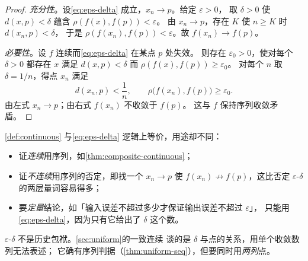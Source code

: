 \begin{proof}
  \emph{充分性}。设\cref{eq:eps-delta} 成立，\(x_{n} \to p\)。给定 \(\varepsilon>0\)，
  取 \(\delta>0\) 使 \(d(x,p)<\delta\) 蕴含 \(\rho(f(x),f(p))<\varepsilon\)。
  由 \(x_{n} \to p\)，存在 \(K\) 使 \(n \ge K\) 时 \(d(x_{n},p)<\delta\)，
  于是 \(\rho(f(x_{n}),f(p))<\varepsilon\)。故 \(f(x_{n}) \to f(p)\)。

  \emph{必要性}。设 \(f\) 连续而\cref{eq:eps-delta} 在某点 \(p\) 处失效。
  则存在 \(\varepsilon_{0}>0\)，使对每个 \(\delta>0\) 都存在 \(x\) 满足
  \(d(x,p)<\delta\) 而 \(\rho(f(x),f(p)) \ge \varepsilon_{0}\)。
  对每个 \(n\) 取 \(\delta = 1/n\)，得点 \(x_{n}\) 满足
  \begin{equation}
    \label{eq:bad-sequence}
    d(x_{n},p) < \frac{1}{n}, \qquad
    \rho\bigl(f(x_{n}), f(p)\bigr) \ge \varepsilon_{0}.
  \end{equation}
  由左式 \(x_{n} \to p\)；由右式 \(f(x_{n})\) 不收敛于 \(f(p)\)。
  这与 \(f\) 保持序列收敛矛盾。
\end{proof}

\begin{remark}[两副面孔的分工]
  \cref{def:continuous} 与\cref{eq:eps-delta} 逻辑上等价，用途却不同：
  \begin{itemize}
    \item 证\emph{连续}用序列，如\cref{thm:composite-continuous}；
    \item 证\emph{不连续}用序列的否定，即找一个 \(x_{n} \to p\) 使
          \(f(x_{n}) \not\to f(p)\)，这比否定 \(\varepsilon\)-\(\delta\) 的两层量词容易得多；
    \item 要\emph{定量}结论，如「输入误差不超过多少才保证输出误差不超过 \(\varepsilon\)」，
          只能用\cref{eq:eps-delta}，因为只有它给出了 \(\delta\) 这个数。
  \end{itemize}
  \(\varepsilon\)-\(\delta\) 不是历史包袱。\cref{sec:uniform}的一致连续
  谈的是 \(\delta\) 与点的关系，用单个收敛数列无法表述；
  它确有序列判据（\cref{thm:uniform-seq}），但要同时用\emph{两列}点。
\end{remark}

